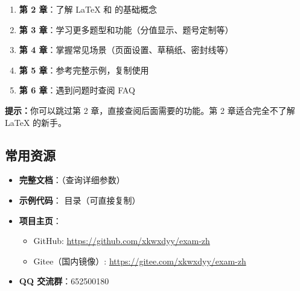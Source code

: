 \begin{enumerate}
  \item \textbf{第 2 章}：了解 \LaTeX{} 和  的基础概念
  \item \textbf{第 3 章}：学习更多题型和功能（分值显示、题号定制等）
  \item \textbf{第 4 章}：掌握常见场景（页面设置、草稿纸、密封线等）
  \item \textbf{第 5 章}：参考完整示例，复制使用
  \item \textbf{第 6 章}：遇到问题时查阅 FAQ
\end{enumerate}

\textbf{提示：}你可以跳过第 2 章，直接查阅后面需要的功能。第 2 章适合完全不了解 \LaTeX{} 的新手。

\subsection{常用资源}

\begin{itemize}
  \item \textbf{完整文档}：（查询详细参数）
  \item \textbf{示例代码}： 目录（可直接复制）
  \item \textbf{项目主页}：
    \begin{itemize}
      \item GitHub: \url{https://github.com/xkwxdyy/exam-zh}
      \item Gitee（国内镜像）: \url{https://gitee.com/xkwxdyy/exam-zh}
    \end{itemize}
  \item \textbf{QQ 交流群}：652500180
\end{itemize}
